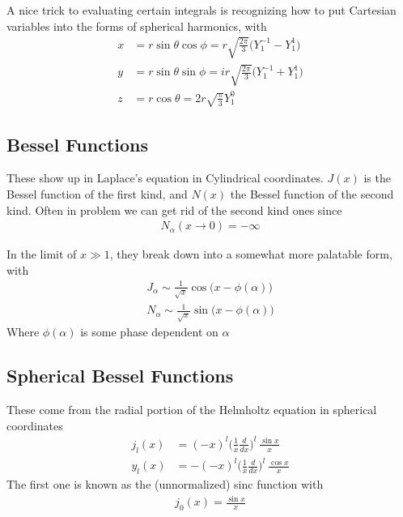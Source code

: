 A nice trick to evaluating certain integrals is recognizing how to put Cartesian variables into the forms of spherical harmonics, with
\begin{align}
x &= r\sin\theta \cos\phi = r\sqrt{\frac{2\pi}{3}}\Big(Y^{-1}_1 - Y^1_1\Big)\\
y &= r\sin\theta\sin\phi = ir\sqrt{\frac{2\pi}{3}}\Big(Y^{-1}_1 + Y^1_1\Big)\\
z &= r\cos\theta = 2r\sqrt{\frac{\pi}{3}}Y_1^0
\end{align}


\subsection{Bessel Functions}\label{bessel}

These show up in Laplace's equation in Cylindrical coordinates. $J(x)$ is the Bessel function of the first kind, and $N(x)$ the Bessel function of the second kind. Often in problem we can get rid of the second kind ones since
\begin{align}
N_\alpha(x\rightarrow 0) =-\infty
\end{align}


In the limit of $x\gg 1$, they break down into a somewhat more palatable form, with
\begin{align}
J_\alpha \sim \frac{1}{\sqrt{x}}\cos\Big(x - \phi(\alpha)\Big)\\
N_\alpha \sim \frac{1}{\sqrt{x}}\sin\Big(x - \phi(\alpha)\Big)
\end{align}
Where $\phi(\alpha)$ is some phase dependent on $\alpha$ 


\subsection{Spherical Bessel Functions}
These come from the radial portion of the Helmholtz equation in spherical coordinates
\begin{align}
j_l(x) &= (-x)^l \Big(\frac{1}{x}\frac{d}{dx}\Big)^l~\frac{\sin x}{x}\\
y_l(x) &= -(-x)^l\Big(\frac{1}{x}\frac{d}{dx}\Big)^l~\frac{\cos x}{x}
\end{align}
The first one is known as the (unnormalized) sinc function with
\begin{align}
j_0(x) = \frac{\sin x}{x}
\end{align}

